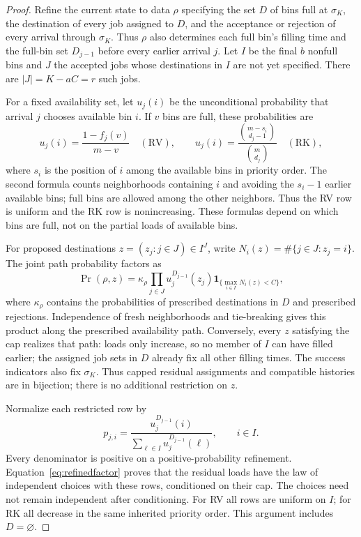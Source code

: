 \documentclass[11pt]{article}
\newcommand{\RV}{\mathrm{RV}}
\newcommand{\RK}{\mathrm{RK}}
\begin{document}
\begin{proof}
Refine the current state to data $\rho$ specifying the set $D$ of
bins full at $\sigma_K$, the
destination of every job assigned to $D$, and the acceptance or
rejection of every arrival through $\sigma_K$. Thus $\rho$ also
determines each full bin's filling time and the full-bin set
$D_{j-1}$ before every earlier arrival $j$. Let $I$ be the final
$b$ nonfull bins and $J$ the accepted jobs whose destinations in
$I$ are not yet specified. There are $|J|=K-aC=r$ such jobs.

For a fixed availability set, let $u_j(i)$ be the unconditional
probability that arrival $j$ chooses available bin $i$. If $v$ bins
are full, these probabilities are
\[
 u_j(i)=\frac{1-f_j(v)}{m-v}\quad(\RV),\qquad
 u_j(i)=\frac{\binom{m-s_i}{d_j-1}}{\binom m{d_j}}
       \quad(\RK),
\]
where $s_i$ is the position of $i$ among the available bins in
priority order. The second formula counts neighborhoods containing
$i$ and avoiding the $s_i-1$ earlier available bins; full bins
are allowed among the other neighbors. Thus the RV row is uniform
and the RK row is nonincreasing. These formulas depend on which
bins are full, not on the partial loads of available bins.

For proposed destinations $z=(z_j:j\in J)\in I^J$, write
$N_i(z)=\#\{j\in J:z_j=i\}$. The joint path probability factors as
\begin{equation}\label{eq:refinedfactor}
 \Pr(\rho,z)=\kappa_\rho
      \prod_{j\in J}u_j^{D_{j-1}}(z_j)
      \mathbf1_{\{\max_{i\in I}N_i(z)<C\}},
\end{equation}
where $\kappa_\rho$ contains the probabilities of prescribed
destinations in $D$ and prescribed rejections. Independence of fresh
neighborhoods and tie-breaking gives this product along the prescribed
availability path. Conversely, every $z$ satisfying the cap realizes
that path: loads only increase, so no member of $I$ can have filled
earlier; the assigned job sets in $D$ already fix all other filling
times. The success indicators also fix $\sigma_K$. Thus capped residual
assignments and compatible histories are in bijection; there is no
additional restriction on $z$.

Normalize each restricted row by
\[
 p_{j,i}=\frac{u_j^{D_{j-1}}(i)}
                  {\sum_{\ell\in I}u_j^{D_{j-1}}(\ell)},
 \qquad i\in I.
\]
Every denominator is positive on a positive-probability refinement.
Equation~\eqref{eq:refinedfactor} proves that the residual loads
have the law of independent choices with these rows, conditioned on
their cap. The choices need not remain independent after conditioning.
For RV all rows are uniform on $I$; for RK all decrease in the
same inherited priority order. This argument includes $D=\varnothing$.


\end{proof}
\end{document}
